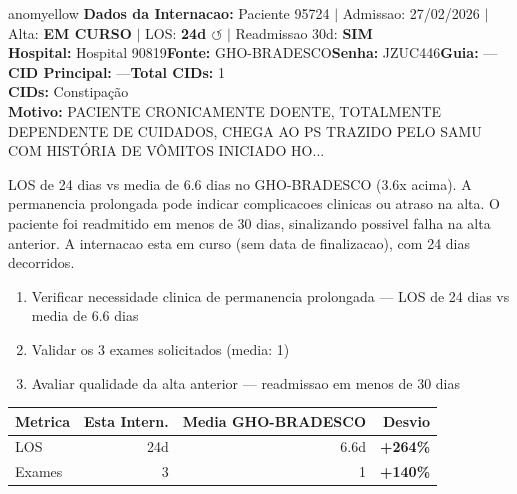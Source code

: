 \documentclass[a4paper,10pt]{article}
\begin{document}
\begin{anomalycard}[Internacao 119256 | GHO-BRADESCO | MODERADO (z=2.22)]{anomyellow}
\textbf{Dados da Internacao:} Paciente 95724 $\mid$ Admissao: 27/02/2026 $\mid$ Alta: \textcolor{anomorange}{\textbf{EM CURSO}} $\mid$ LOS: \textbf{24d \textcolor{anomorange}{$\circlearrowleft$}} $\mid$ Readmissao 30d: \textcolor{anomred}{\textbf{SIM}}\\
\textbf{Hospital:} Hospital 90819\quad\textbf{Fonte:} GHO-BRADESCO\quad\textbf{Senha:} JZUC446\quad\textbf{Guia:} ---\\
\textbf{CID Principal:} {\small ---}\quad\textbf{Total CIDs:} 1\\

\textbf{CIDs:} {\scriptsize Constipação}\\

\textbf{Motivo:} {\scriptsize PACIENTE CRONICAMENTE DOENTE, TOTALMENTE DEPENDENTE DE CUIDADOS, CHEGA AO PS TRAZIDO PELO SAMU COM HISTÓRIA DE VÔMITOS INICIADO HO...}\\

\vspace{2pt}\begin{tcolorbox}[colback=severityred!20,colframe=anomyellow,title={\textbf{Interpretacao de Negocio}},fonttitle=\bfseries\small,left=4pt,right=4pt,top=3pt,bottom=3pt]
{\small LOS de 24 dias vs media de 6.6 dias no GHO-BRADESCO (3.6x acima). A permanencia prolongada pode indicar complicacoes clinicas ou atraso na alta. O paciente foi readmitido em menos de 30 dias, sinalizando possivel falha na alta anterior. A internacao esta em curso (sem data de finalizacao), com 24 dias decorridos.}
\end{tcolorbox}
\begin{tcolorbox}[colback=severityyellow!30,colframe=anomorange,title={\textbf{Recomendacoes Especificas}},fonttitle=\bfseries\small,left=4pt,right=4pt,top=3pt,bottom=3pt]
\begin{enumerate}[nosep,leftmargin=16pt]
\item {\small Verificar necessidade clinica de permanencia prolongada --- LOS de 24 dias vs media de 6.6 dias}
\item {\small Validar os 3 exames solicitados (media: 1)}
\item {\small Avaliar qualidade da alta anterior --- readmissao em menos de 30 dias}
\end{enumerate}
\end{tcolorbox}
\begin{center}\begin{tabular}{l r r r}\toprule\textbf{Metrica} & \textbf{Esta Intern.} & \textbf{Media GHO-BRADESCO} & \textbf{Desvio} \\\midrule
LOS & 24d & 6.6d & \textcolor{anomred}{\textbf{+264\%}} \\
Exames & 3 & 1 & \textcolor{anomred}{\textbf{+140\%}} \\
\bottomrule\end{tabular}\end{center}


\end{anomalycard}
\end{document}
